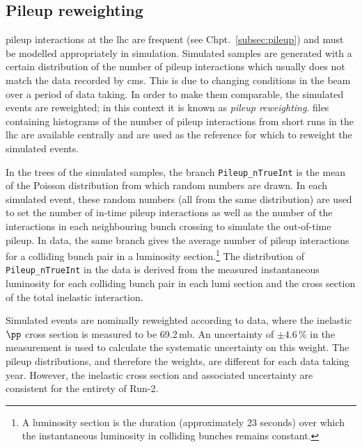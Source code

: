 

\subsection{Pileup reweighting}
\label{subsec:pu_reweighting}

\Gls{pileup} interactions at the \acrshort{lhc} are frequent (see Chpt.~\ref{subsec:pileup}) and must be modelled appropriately in simulation. Simulated samples are generated with a certain distribution of the number of \gls{pileup} interactions which usually does not match the data recorded by \acrshort{cms}. This is due to changing conditions in the beam over a period of data taking. In order to make them comparable, the simulated events are reweighted; in this context it is known as \emph{\gls{pileup} reweighting}. \ROOT files containing histograms of the number of \gls{pileup} interactions from short runs in the \acrshort{lhc} are available centrally and are used as the reference for which to reweight the simulated events.

In the trees of the simulated samples, the branch \texttt{Pileup\_nTrueInt} is the mean of the Poisson distribution from which random numbers are drawn. In each simulated event, these random numbers (all from the same distribution) are used to set the number of in-time \gls{pileup} interactions as well as the number of the interactions in each neighbouring bunch crossing to simulate the out-of-time \gls{pileup}. In data, the same branch gives the average number of \gls{pileup} interactions for a colliding bunch pair in a luminosity section.\footnote{A luminosity section is the duration (approximately 23 seconds) over which the instantaneous luminosity in colliding bunches remains constant.} The distribution of \texttt{Pileup\_nTrueInt} in the data is derived from the measured instantaneous luminosity for each colliding bunch pair in each lumi section and the cross section of the total inelastic \pp interaction.

Simulated events are nominally reweighted according to data, where the inelastic $\pp$ cross section is measured to be 69.2\,mb. An uncertainty of $\pm \text{4.6}$\,\% in the measurement is used to calculate the systematic uncertainty on this weight. The pileup distributions, and therefore the weights, are different for each data taking year. However, the inelastic cross section and associated uncertainty are consistent for the entirety of Run-2.

